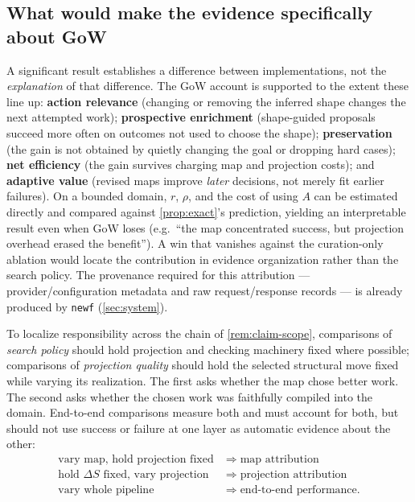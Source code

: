 \documentclass[11pt]{article}
\theoremstyle{gowthm}
\theoremstyle{gowplain}
\begin{document}
\subsection{What would make the evidence specifically about GoW}
\label{sec:superiority-attribution}
A significant result establishes a difference between implementations, not the
\emph{explanation} of that difference. The GoW account is supported to the
extent these line up: \textbf{action relevance} (changing or removing the
inferred shape changes the next attempted work); \textbf{prospective enrichment}
(shape-guided proposals succeed more often on outcomes not used to choose the
shape); \textbf{preservation} (the gain is not obtained by quietly changing the
goal or dropping hard cases); \textbf{net efficiency} (the gain survives charging
map and projection costs); and \textbf{adaptive value} (revised maps improve
\emph{later} decisions, not merely fit earlier failures). On a bounded domain,
$r$, $\rho$, and the cost of using $A$ can be estimated directly and compared
against \cref{prop:exact}'s prediction, yielding an interpretable result even
when GoW loses (e.g.\ ``the map concentrated success, but projection overhead
erased the benefit''). A win that vanishes against the curation-only ablation
would locate the contribution in evidence organization rather than the search
policy. The provenance required for this attribution --- provider/configuration
metadata and raw request/response records --- is already produced by
\texttt{newf} (\cref{sec:system}).

To localize responsibility across the chain of \cref{rem:claim-scope},
comparisons of \emph{search policy} should hold projection and checking
machinery fixed where possible; comparisons of \emph{projection quality} should
hold the selected structural move fixed while varying its realization. The
first asks whether the map chose better work. The second asks whether the
chosen work was faithfully compiled into the domain. End-to-end comparisons
measure both and must account for both, but should not use success or failure
at one layer as automatic evidence about the other:
\[
\begin{aligned}
\text{vary map, hold projection fixed} &\;\Rightarrow\; \text{map attribution}\\
\text{hold } \Delta S \text{ fixed, vary projection} &\;\Rightarrow\; \text{projection attribution}\\
\text{vary whole pipeline} &\;\Rightarrow\; \text{end-to-end performance.}
\end{aligned}
\]
\end{document}
